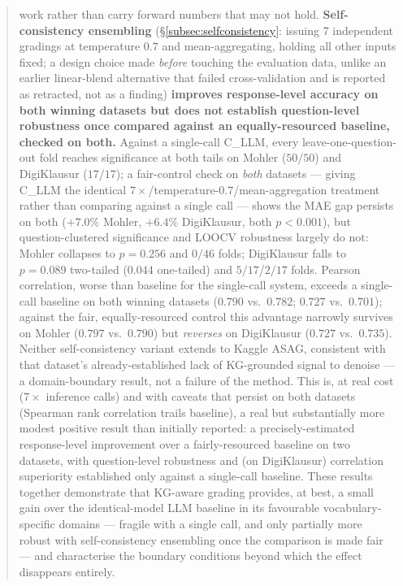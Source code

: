 \documentclass[conference]{IEEEtran}
\begin{document}
\begin{abstract}
work rather than carry forward numbers that may not hold. \textbf{Self-consistency
ensembling} (\S\ref{subsec:selfconsistency}: issuing 7 independent
gradings at temperature $0.7$ and mean-aggregating, holding all other
inputs fixed; a design choice made \emph{before} touching the evaluation
data, unlike an earlier linear-blend alternative that failed
cross-validation and is reported as retracted, not as a finding)
\textbf{improves response-level accuracy on both winning datasets but
does not establish question-level robustness once compared against an
equally-resourced baseline, checked on both.} Against a single-call
C\_LLM, every leave-one-question-out fold reaches significance at both
tails on Mohler ($50/50$) and DigiKlausur ($17/17$); a fair-control check
on \emph{both} datasets --- giving C\_LLM the identical
$7\times$/temperature-$0.7$/mean-aggregation treatment rather than
comparing against a single call --- shows the MAE gap persists on both
($+7.0\%$ Mohler, $+6.4\%$ DigiKlausur, both $p<0.001$), but
question-clustered significance and LOOCV robustness largely do not:
Mohler collapses to $p=0.256$ and $0/46$ folds; DigiKlausur falls to
$p=0.089$ two-tailed ($0.044$ one-tailed) and $5/17$/$2/17$ folds.
Pearson correlation, worse than baseline for the single-call system,
exceeds a single-call baseline on both winning datasets ($0.790$ vs.\
$0.782$; $0.727$ vs.\ $0.701$); against the fair, equally-resourced
control this advantage narrowly survives on Mohler ($0.797$ vs.\
$0.790$) but \emph{reverses} on DigiKlausur ($0.727$ vs.\ $0.735$).
Neither self-consistency variant extends to
Kaggle ASAG, consistent with that dataset's already-established
lack of KG-grounded signal to denoise --- a domain-boundary result, not
a failure of the method. This is, at real cost ($7\times$ inference
calls) and with caveats that persist on both datasets (Spearman rank
correlation trails baseline), a real but substantially more modest
positive result than initially reported: a precisely-estimated
response-level improvement over a fairly-resourced baseline on two
datasets, with question-level robustness and (on DigiKlausur)
correlation superiority established only against a single-call
baseline. These results together
demonstrate that KG-aware grading provides, at best, a small gain over
the identical-model LLM baseline in its favourable vocabulary-specific
domains --- fragile with a single call, and only partially more robust
with self-consistency ensembling once the comparison is made fair ---
and characterise the boundary conditions beyond which the effect
disappears entirely.
\end{abstract}
\end{document}
